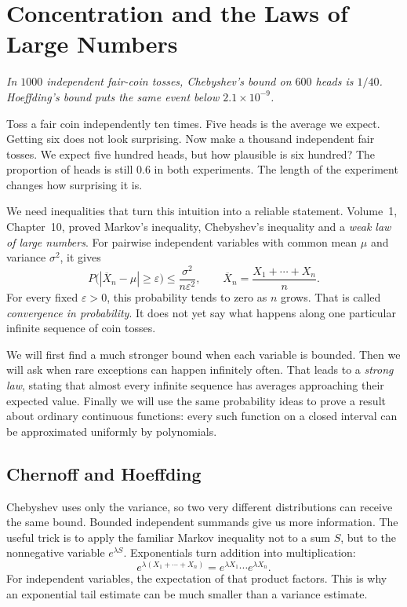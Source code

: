\chapter{Concentration and the Laws of Large Numbers}

\begin{center}\itshape
In $1000$ independent fair-coin tosses, Chebyshev's bound on $600$ heads is $1/40$.\\
Hoeffding's bound puts the same event below $2.1\times 10^{-9}$.
\end{center}

Toss a fair coin independently ten times. Five heads is the average we expect. Getting six does not look surprising. Now make a thousand independent fair tosses. We expect five hundred heads, but how plausible is six hundred? The proportion of heads is still $0.6$ in both experiments. The length of the experiment changes how surprising it is.

We need inequalities that turn this intuition into a reliable statement. Volume~1, Chapter~10, proved Markov's inequality, Chebyshev's inequality and a \emph{weak law of large numbers}. For pairwise independent variables with common mean $\mu$ and variance $\sigma^2$, it gives
\[
 P\bigl(|\overline X_n-\mu|\ge\varepsilon\bigr)
 \le\frac{\sigma^2}{n\varepsilon^2},
 \qquad \overline X_n=\frac{X_1+\cdots+X_n}{n}.
\]
For every fixed $\varepsilon>0$, this probability tends to zero as $n$ grows. That is called \emph{convergence in probability}. It does not yet say what happens along one particular infinite sequence of coin tosses.

We will first find a much stronger bound when each variable is bounded. Then we will ask when rare exceptions can happen infinitely often. That leads to a \emph{strong law}, stating that almost every infinite sequence has averages approaching their expected value. Finally we will use the same probability ideas to prove a result about ordinary continuous functions: every such function on a closed interval can be approximated uniformly by polynomials.

\section{Chernoff and Hoeffding}

Chebyshev uses only the variance, so two very different distributions can receive the same bound. Bounded independent summands give us more information. The useful trick is to apply the familiar Markov inequality not to a sum $S$, but to the nonnegative variable $e^{\lambda S}$. Exponentials turn addition into multiplication:
\[
 e^{\lambda(X_1+\cdots+X_n)}
   =e^{\lambda X_1}\cdots e^{\lambda X_n}.
\]
For independent variables, the expectation of that product factors. This is why an exponential tail estimate can be much smaller than a variance estimate.

